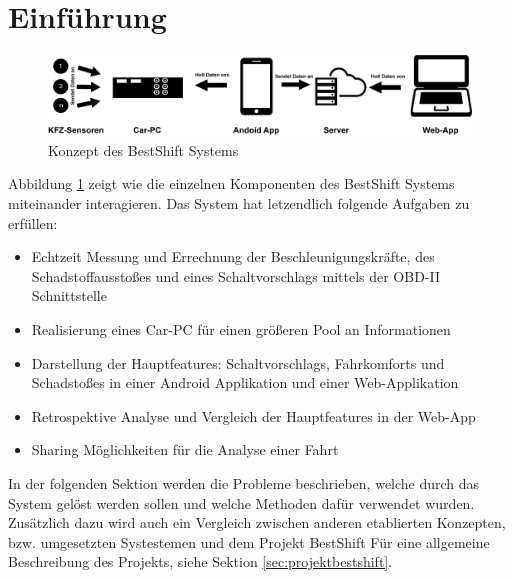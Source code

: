 \section{Einführung}
\label{sec:intro}

\begin{figure}[!htb]
	\centering
	\includegraphics[scale=0.6]{images/konzept}
	\caption{Konzept des BestShift Systems}
	\label{fig:konzept1}
\end{figure}

Abbildung \ref{fig:konzept1} zeigt wie die einzelnen Komponenten des BestShift Systems miteinander interagieren. Das System hat letzendlich folgende Aufgaben zu erfüllen:

\begin{itemize}
	\item Echtzeit Messung und Errechnung der Beschleunigungskräfte, des Schadstoffausstoßes und eines Schaltvorschlags mittels der OBD-II Schnittstelle
	\item Realisierung eines Car-PC für einen größeren Pool an Informationen
	\item Darstellung der Hauptfeatures: Schaltvorschlags, Fahrkomforts und Schadstoßes in einer Android Applikation und einer Web-Applikation
	\item Retrospektive Analyse und Vergleich der Hauptfeatures in der Web-App
	\item Sharing Möglichkeiten für die Analyse einer Fahrt
\end{itemize}

In der folgenden Sektion werden die Probleme beschrieben, welche durch das System gelöst werden sollen und welche Methoden dafür verwendet wurden. Zusätzlich dazu wird auch ein Vergleich zwischen anderen etablierten Konzepten, bzw. umgesetzten Systestemen und dem Projekt BestShift Für eine allgemeine Beschreibung des Projekts, siehe Sektion \ref{sec:projektbestshift}.



